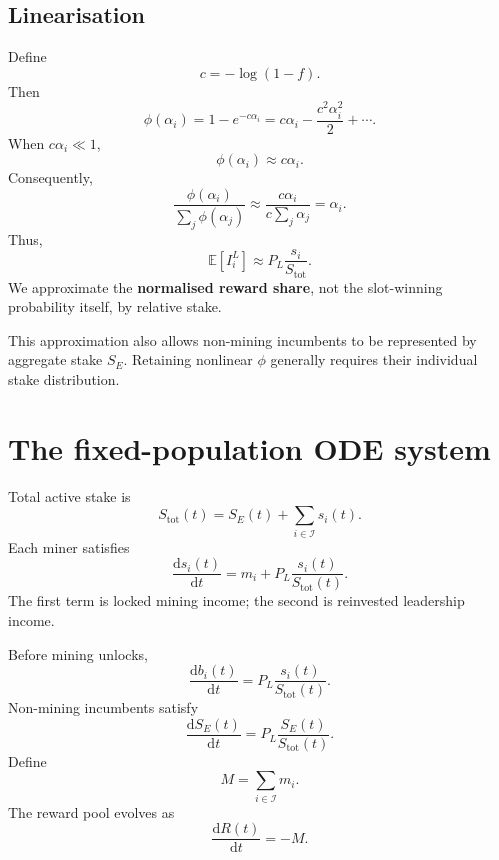 \documentclass[11pt,a4paper]{article}
\newcommand{\rmd}{\mathrm{d}}
\begin{document}
\subsection{Linearisation}
Define
\begin{equation}
c=-\log(1-f).
\end{equation}
Then
\begin{equation}
\phi(\alpha_i)=1-e^{-c\alpha_i}=c\alpha_i-\frac{c^2\alpha_i^2}{2}+\cdots.
\end{equation}
When $c\alpha_i\ll1$,
\begin{equation}
\phi(\alpha_i)\approx c\alpha_i.
\end{equation}
Consequently,
\begin{equation}
\frac{\phi(\alpha_i)}{\sum_j\phi(\alpha_j)}\approx\frac{c\alpha_i}{c\sum_j\alpha_j}=\alpha_i.
\end{equation}
Thus,
\begin{equation}
\boxed{\mathbb E[I_i^L]\approx P_L\frac{s_i}{S_{\mathrm{tot}}}.}
\end{equation}
We approximate the \textbf{normalised reward share}, not the slot-winning probability itself, by relative stake.

This approximation also allows non-mining incumbents to be represented by aggregate stake $S_E$. Retaining nonlinear $\phi$ generally requires their individual stake distribution.

\section{The fixed-population ODE system}
Total active stake is
\begin{equation}
\boxed{S_{\mathrm{tot}}(t)=S_E(t)+\sum_{i\in\mathcal I}s_i(t)}.
\end{equation}
Each miner satisfies
\begin{equation}
\boxed{\frac{\rmd s_i(t)}{\rmd t}=m_i+P_L\frac{s_i(t)}{S_{\mathrm{tot}}(t)}.}
\end{equation}
The first term is locked mining income; the second is reinvested leadership income.

Before mining unlocks,
\begin{equation}
\boxed{\frac{\rmd b_i(t)}{\rmd t}=P_L\frac{s_i(t)}{S_{\mathrm{tot}}(t)}.}
\end{equation}
Non-mining incumbents satisfy
\begin{equation}
\boxed{\frac{\rmd S_E(t)}{\rmd t}=P_L\frac{S_E(t)}{S_{\mathrm{tot}}(t)}.}
\end{equation}
Define
\begin{equation}
M=\sum_{i\in\mathcal I}m_i.
\end{equation}
The reward pool evolves as
\begin{equation}
\boxed{\frac{\rmd R(t)}{\rmd t}=-M.}
\end{equation}
\end{document}
